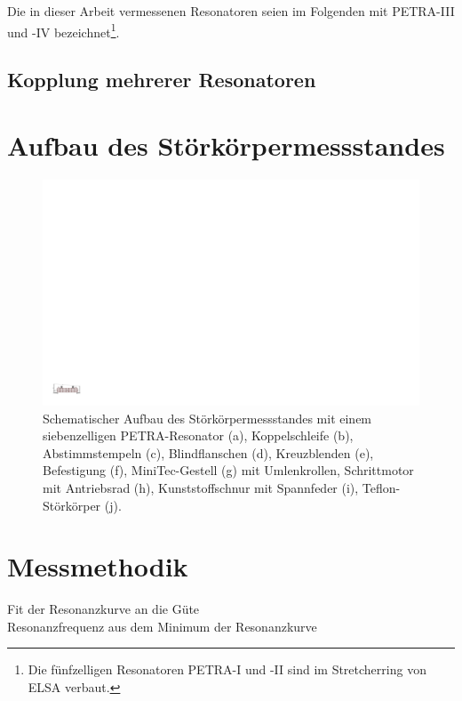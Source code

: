 
Die in dieser Arbeit vermessenen Resonatoren seien im Folgenden mit PETRA-III und -IV bezeichnet\footnote{Die fünfzelligen Resonatoren PETRA-I und -II sind im Stretcherring von ELSA verbaut.}.



\subsection{Kopplung mehrerer Resonatoren}


\section{Aufbau des Störkörpermessstandes}
\begin{figure}
	\centering
	\includegraphics[width=1.0\textheight]{./figs/cavity/messaufbau.pdf}
	\caption{Schematischer Aufbau des Störkörpermessstandes mit einem siebenzelligen PETRA-Resonator (a),  Koppelschleife (b), Abstimmstempeln (c), Blindflanschen (d), Kreuzblenden (e), Befestigung (f), MiniTec-Gestell (g) mit Umlenkrollen, Schrittmotor mit Antriebsrad (h), Kunststoffschnur mit Spannfeder (i), Teflon-Störkörper (j).}
\end{figure}


\section{Messmethodik}
Fit der Resonanzkurve an die Güte\\
Resonanzfrequenz aus dem Minimum der Resonanzkurve
